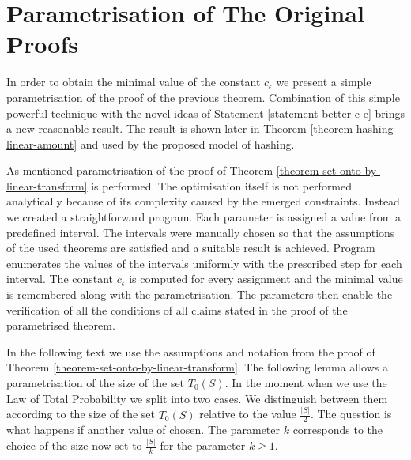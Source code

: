\section{Parametrisation of The Original Proofs}
In order to obtain the minimal value of the constant $c_\epsilon$ we present a simple parametrisation of the proof of the previous theorem. Combination of this simple powerful technique with the novel ideas of Statement \ref{statement-better-c-e} brings a new reasonable result. The result is shown later in Theorem \ref{theorem-hashing-linear-amount} and used by the proposed model of hashing.

As mentioned parametrisation of the proof of Theorem \ref{theorem-set-onto-by-linear-transform} is performed. The optimisation itself is not performed analytically because of its complexity caused by the emerged constraints. Instead we created a straightforward program. Each parameter is assigned a value from a predefined interval. The intervals were manually chosen so that the assumptions of the used theorems are satisfied and a suitable result is achieved. Program enumerates the values of the intervals uniformly with the prescribed step for each interval. The constant $c_\epsilon$ is computed for every assignment and the minimal value is remembered along with the parametrisation. The parameters then enable the verification of all the conditions of all claims stated in the proof of the parametrised theorem. 

In the following text we use the assumptions and notation from the proof of Theorem \ref{theorem-set-onto-by-linear-transform}. The following lemma allows a parametrisation of the size of the set $T_0(S)$. In the moment when we use the Law of Total Probability we split into two cases. We distinguish between them according to the size of the set $T_0(S)$ relative to the value $\frac{|S|}{2}$. The question is what happens if another value of chosen. The parameter $k$ corresponds to the choice of the size now set to $\frac{|S|}{k}$ for the parameter $k \geq 1$.

